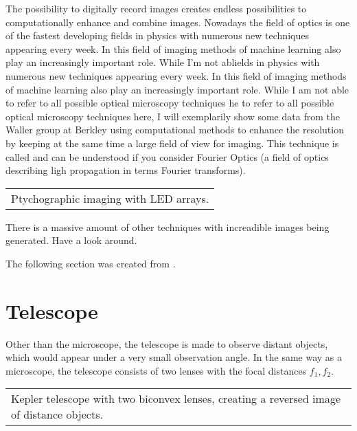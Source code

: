 \documentclass[letterpaper,10pt,english]{sphinxmanual}
\begin{document}
The possibility to digitally record images creates endless possibilities to computationally enhance and combine images. Nowadays the field of optics is one of the fastest developing fields in physics with numerous new techniques appearing every week. In this field of imaging methods of machine learning also play an increasingly important role. While I’m not ablields in physics with numerous new techniques appearing every week. In this field of imaging methods of machine learning also play an
increasingly important role. While I am not able to refer to all possible optical microscopy techniques he to refer to all possible optical microscopy techniques here, I will exemplarily show some data from the Waller group at Berkley using computational methods to enhance the resolution by keeping at the same time a large field of view for imaging. This technique is called  and can be understood if you consider Fourier Optics (a field of optics describing ligh propagation in
terms Fourier transforms).


\begin{savenotes}\sphinxattablestart
\centering
\begin{tabulary}{\linewidth}[t]{|T|}
\hline
\sphinxstyletheadfamily 
{}
\\
\hline
{} Ptychographic imaging with LED arrays.
\\
\hline
\end{tabulary}
\par
\sphinxattableend\end{savenotes}

There is a massive amount of other techniques with increadible images being generated. Have a look around.

The following section was created from .


\section{Telescope}
\label{\detokenize{notebooks/L6/Telescope:Telescope}}\label{\detokenize{notebooks/L6/Telescope::doc}}
Other than the microscope, the telescope is made to observe distant objects, which would appear under a very small observation angle. In the same way as a microscope, the telescope consists of two lenses with the focal distances \(f_1,f_2\).


\begin{savenotes}\sphinxattablestart
\centering
\begin{tabulary}{\linewidth}[t]{|T|}
\hline
\sphinxstyletheadfamily 
{}
\\
\hline
{} Kepler telescope with two biconvex lenses, creating a reversed image of distance objects.
\\
\hline
\end{tabulary}
\par
\sphinxattableend\end{savenotes}
\end{document}
